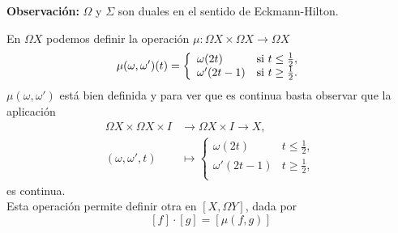 \textbf{Observación:} $\Omega$ y $\Sigma$ son duales en el sentido de Eckmann-Hilton. \par

En $\Omega X$ podemos definir la operación  $\mu : \Omega X \times \Omega X \longrightarrow \Omega X$
\[
\mu(\omega, \omega')(t) = 
\left\{ \begin{array}{ll}
             \omega(2t)		&   $si $ t \leq \frac{1}{2}, \\
             \omega'(2t-1)	&   $si $ t \geq \frac{1}{2}. \\
        \end{array}
\right.
\]
$\mu(\omega, \omega')$ está bien definida y para ver que es continua basta observar que la aplicación
\begin{align*}
\Omega X \times \Omega X \times I &\longrightarrow \Omega X \times I \longrightarrow X, \\
(\omega, \omega', t) &\longmapsto 
\left\{ \begin{array}{ll}
             \omega(2t)		&  t \leq \frac{1}{2}, \\
             \omega'(2t-1)	&  t \geq \frac{1}{2}, \\
        \end{array}
\right.
\end{align*}
 es continua. \\
Esta operación permite definir otra en $[X, \Omega Y]$, dada por 
\[  
[f] \cdotp [g] = [\mu(f, g)] 
\]

